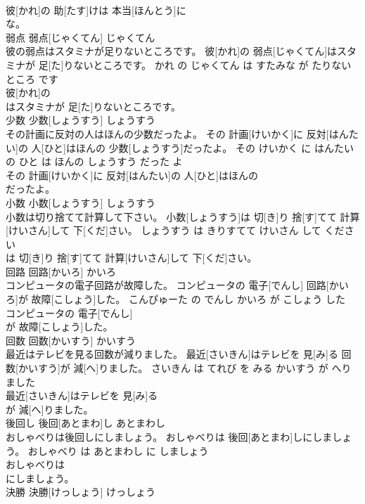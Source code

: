 \documentclass[8pt]{extreport}
\begin{document}
\begin{CJK}{UTF8}{min}
\\	彼[かれ]の 助[たす]けは 本当[ほんとう]に
\\	な。			
\\	弱点	弱点[じゃくてん]	じゃくてん	
\\	彼の弱点はスタミナが足りないところです。	彼[かれ]の 弱点[じゃくてん]はスタミナが 足[た]りないところです。	かれ の じゃくてん は すたみな が たりない ところ です	
\\	彼[かれ]の
\\	はスタミナが 足[た]りないところです。			
\\	少数	少数[しょうすう]	しょうすう	
\\	その計画に反対の人はほんの少数だったよ。	その 計画[けいかく]に 反対[はんたい]の 人[ひと]はほんの 少数[しょうすう]だったよ。	その けいかく に はんたい の ひと は ほんの しょうすう だった よ	
\\	その 計画[けいかく]に 反対[はんたい]の 人[ひと]はほんの
\\	だったよ。			
\\	小数	小数[しょうすう]	しょうすう	
\\	小数は切り捨てて計算して下さい。	小数[しょうすう]は 切[き]り 捨[す]てて 計算[けいさん]して 下[くだ]さい。	しょうすう は きりすてて けいさん して ください	
\\	は 切[き]り 捨[す]てて 計算[けいさん]して 下[くだ]さい。			
\\	回路	回路[かいろ]	かいろ	
\\	コンピュータの電子回路が故障した。	コンピュータの 電子[でんし] 回路[かいろ]が 故障[こしょう]した。	こんぴゅーた の でんし かいろ が こしょう した	
\\	コンピュータの 電子[でんし]
\\	が 故障[こしょう]した。			
\\	回数	回数[かいすう]	かいすう	
\\	最近はテレビを見る回数が減りました。	最近[さいきん]はテレビを 見[み]る 回数[かいすう]が 減[へ]りました。	さいきん は てれび を みる かいすう が へりました	
\\	最近[さいきん]はテレビを 見[み]る
\\	が 減[へ]りました。			
\\	後回し	後回[あとまわ]し	あとまわし	
\\	おしゃべりは後回しにしましょう。	おしゃべりは 後回[あとまわ]しにしましょう。	おしゃべり は あとまわし に しましょう	
\\	おしゃべりは
\\	にしましょう。			
\\	決勝	決勝[けっしょう]	けっしょう	

\end{CJK}
\end{document}
